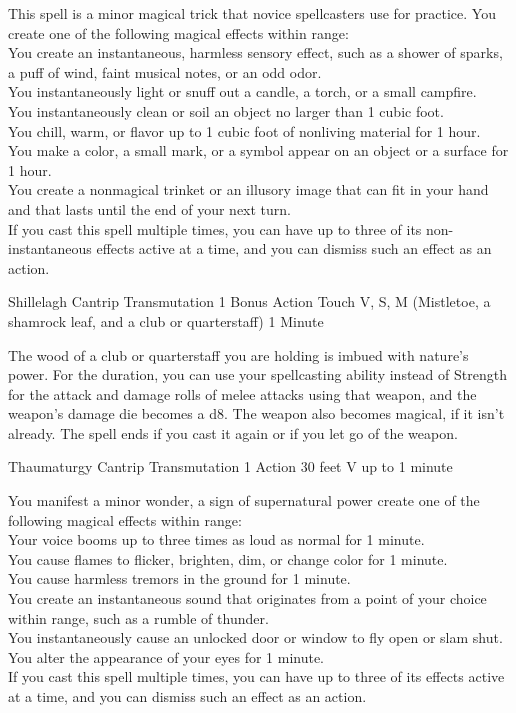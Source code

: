 \documentclass[letterpaper,openany,oneside,twocolumn]{book}
\begin{document}
This spell is a minor magical trick that novice spellcasters use for practice. You create one of the following magical effects within range:\\
You create an instantaneous, harmless sensory effect, such as a shower of sparks, a puff of wind, faint musical notes, or an odd odor.\\
You instantaneously light or snuff out a candle, a torch, or a small campfire.\\
You instantaneously clean or soil an object no larger than 1 cubic foot.\\
You chill, warm, or flavor up to 1 cubic foot of nonliving material for 1 hour.\\
You make a color, a small mark, or a symbol appear on an object or a surface for 1 hour.\\
You create a nonmagical trinket or an illusory image that can fit in your hand and that lasts until the end of your next turn.\\
If you cast this spell multiple times, you can have up to three of its non-instantaneous effects active at a time, and you can dismiss such an effect as an action.

\DndSpellHeader
  {Shillelagh}
  {Cantrip Transmutation}
  {1 Bonus Action}
  {Touch}
  {V, S, M (Mistletoe, a shamrock leaf, and a club or quarterstaff)}
  {1 Minute}
  
The wood of a club or quarterstaff you are holding is imbued with nature's power. For the duration, you can use your spellcasting ability instead of Strength for the attack and damage rolls of melee attacks using that weapon, and the weapon's damage die becomes a d8. The weapon also becomes magical, if it isn't already. The spell ends if you cast it again or if you let go of the weapon.

\DndSpellHeader
  {Thaumaturgy}
  {Cantrip Transmutation}
  {1 Action}
  {30 feet}
  {V}
  {up to 1 minute}

You manifest a minor wonder, a sign of supernatural power create one of the following magical effects within range:\\
Your voice booms up to three times as loud as normal for 1 minute.\\
You cause flames to flicker, brighten, dim, or change color for 1 minute.\\
You cause harmless tremors in the ground for 1 minute.\\
You create an instantaneous sound that originates from a point of your choice within range, such as a rumble of thunder.\\
You instantaneously cause an unlocked door or window to fly open or slam shut.\\
You alter the appearance of your eyes for 1 minute.\\
If you cast this spell multiple times, you can have up to three of its effects active at a time, and you can dismiss such an effect as an action.\\
\end{document}

